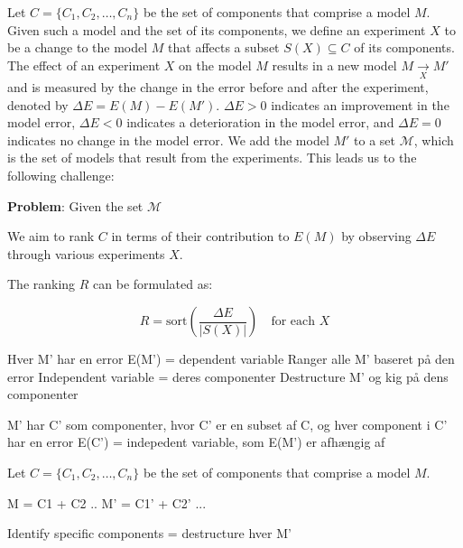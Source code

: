 Let $C = \{C_1, C_2, \ldots, C_n\}$ be the set of components that comprise a model $M$.
Given such a model and the set of its components, we define an experiment $X$ to be a change to the model $M$ that affects a subset $S(X) \subseteq C$ of its components.
The effect of an experiment $X$ on the model $M$ results in a new model $M\underset{X}{\rightarrow}M'$ and is measured by the change in the error before and after the experiment, denoted by $\Delta E = E(M) - E(M')$.
$\Delta E > 0$ indicates an improvement in the model error, $\Delta E < 0$ indicates a deterioration in the model error, and $\Delta E = 0$ indicates no change in the model error.
We add the model $M'$ to a set $\mathcal{M}$, which is the set of models that result from the experiments.
This leads us to the following challenge:

\textbf{Problem}: Given the set $\mathcal{M}$ 


We aim to rank \( C \) in terms of their contribution to \( E(M) \) by observing \( \Delta E \) through various experiments \( X \).

The ranking \( R \) can be formulated as:

\[
R = \text{sort}\left( \frac{\Delta E}{|S(X)|} \right) \quad \text{for each } X
\]

Hver M' har en error E(M') = dependent variable
Ranger alle M' baseret på den error
Independent variable = deres componenter
Destructure M' og kig på dens componenter

M' har C' som componenter, hvor C' er en subset af C, og hver component i C' har en error E(C') = indepedent variable, som E(M') er afhængig af

Let $C = \{C_1, C_2, \ldots, C_n\}$ be the set of components that comprise a model $M$.

M = C1 + C2 .. 
M' = C1' + C2' ...





Identify specific components = destructure hver M'


